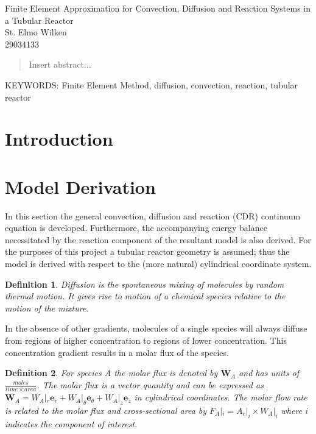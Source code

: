\documentclass[11pt,fleqn]{article}
\theoremstyle{defstyle}
\newtheorem{defn}{Definition}[section]
\begin{document}


\begin{center}
\Large Finite Element Approximation for Convection, Diffusion and Reaction Systems in a Tubular Reactor \\[0.5cm]
\large St. Elmo Wilken \\
29034133
\end{center}

\begin{abstract}
Insert abstract...
\end{abstract}

\textsc{\small KEYWORDS:} \small Finite Element Method, diffusion, convection, reaction, tubular reactor
\tableofcontents
{}

\newpage
{}
\section{Introduction}

\section{Model Derivation}
In this section the general convection, diffusion and reaction (CDR) continuum equation is developed. Furthermore, the accompanying energy balance necessitated by the reaction component of the resultant model is also derived. For the purposes of this project a tubular reactor geometry is assumed; thus the model is derived with respect to the (more natural) cylindrical coordinate system. 

\begin{defn}
Diffusion is the spontaneous mixing of molecules by random thermal motion. It gives rise to motion of a chemical species relative to the motion of the mixture.
\end{defn}

In the absence of other gradients, molecules of a single species will always diffuse from regions of higher concentration to regions of lower concentration. This concentration gradient results in a molar flux of the species.

\begin{defn}
For species A the molar flux is denoted by $\mathbf{W}_A$ and has units of $\frac{moles}{time \times area}$. The molar flux is a vector quantity and can be expressed as $\mathbf{W}_A = W_A|_r \mathbf{e}_r + W_A|_\theta \mathbf{e}_\theta + W_A|_z \mathbf{e}_z$ in cylindrical coordinates. The molar flow rate is related to the molar flux and cross-sectional area by $F_A|_i = A_c|_i \times W_A|_i$ where $i$ indicates the component of interest. 
\end{defn}
\end{document}
